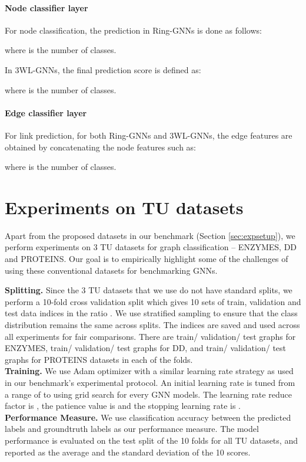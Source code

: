 \documentclass{article}
\begin{document}
\paragraph{Node classifier layer}
For node classification, the prediction in Ring-GNNs is done as follows:

where  is the number of classes. 

In 3WL-GNNs, the final prediction score is defined as:

where  is the number of classes. 


\paragraph{Edge classifier layer}
For link prediction, for both Ring-GNNs and 3WL-GNNs, the edge features are obtained by concatenating the node features such as:

where  is the number of classes. 























\section{Experiments on TU datasets}
\label{sec:TUs}
Apart from the proposed datasets in our benchmark (Section \ref{sec:expsetup}), we perform experiments on 3 TU datasets for graph classification -- ENZYMES, DD and PROTEINS.  
Our goal is to empirically highlight some of the challenges of using these conventional datasets for benchmarking GNNs. 

{\bf Splitting.} Since the 3 TU datasets that we use do not have standard splits, we perform a 10-fold cross validation split which gives 10 sets of train, validation and test data indices in the ratio . We use stratified sampling to ensure that the class distribution remains the same across splits. The indices are saved and used across all experiments for fair comparisons. There are  train/ validation/ test graphs for ENZYMES,  train/ validation/ test graphs for DD, and  train/ validation/ test graphs for PROTEINS datasets in each of the folds. \\
{\bf Training.} We use Adam optimizer with a similar learning rate strategy as used in our benchmark's experimental protocol. An initial learning rate is tuned from a range of  to  using grid search for every GNN models. The learning rate reduce factor is , the patience value is  and the stopping learning rate is .\\
{\bf Performance Measure.} We use classification accuracy between the predicted labels and groundtruth labels as our performance measure. The model performance is evaluated on the test split of the 10 folds for all TU datasets, and reported as the average and the standard deviation of the 10 scores.
\end{document}
